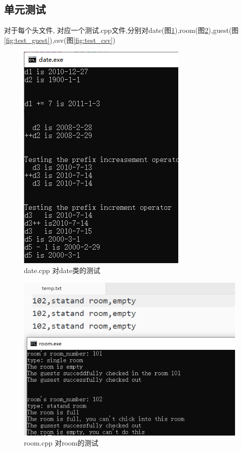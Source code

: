 \documentclass[UTF8]{ctexart}
\begin{document}
  \subsection{单元测试}
    对于每个头文件, 对应一个测试.cpp文件,分别对date(图\ref{fig:test_date}),room(图\ref{fig:test_room}),guest(图\ref{fig:test_guest}),csv(图\ref{fig:test_csv})
    \begin{figure}[H]
      \centering
      \includegraphics[scale=1]{test_date}
      \caption{date.cpp 对date类的测试}
      \label{fig:test_date}
    \end{figure}

  \begin{figure}[H]
    \centering
    \includegraphics[scale=1]{test_room}
    \caption{room.cpp 对room的测试}
    \label{fig:test_room}
  \end{figure}
\end{document}
